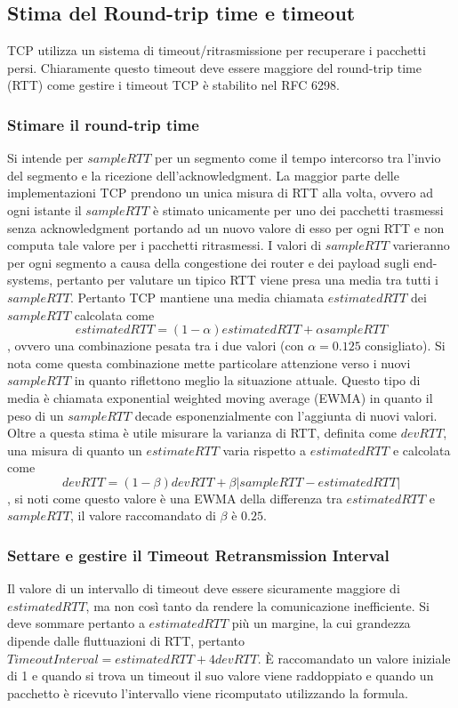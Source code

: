 \subsection{Stima del Round-trip time e timeout}
TCP utilizza un sistema di timeout/ritrasmissione per recuperare i pacchetti persi. Chiaramente questo timeout deve essere maggiore del round-trip time 
(RTT) come gestire i timeout TCP \`e stabilito nel RFC 6298.
\subsubsection{Stimare il round-trip time}
Si intende per $sampleRTT$ per un segmento come il tempo intercorso tra l'invio del segmento e la ricezione dell'acknowledgment. La maggior parte delle 
implementazioni TCP prendono un unica misura di RTT alla volta, ovvero ad ogni istante il $sampleRTT$ \`e stimato unicamente per uno dei pacchetti trasmessi
senza acknowledgment portando ad un nuovo valore di esso per ogni RTT e non computa tale valore per i pacchetti ritrasmessi. I valori di $sampleRTT$ 
varieranno per ogni segmento a causa della congestione dei router e dei payload sugli end-systems, pertanto per valutare un tipico RTT viene presa una media
tra tutti i $sampleRTT$. Pertanto TCP mantiene una media chiamata $estimatedRTT$ dei $sampleRTT$ calcolata come $$estimatedRTT=(1-\alpha)estimatedRTT+\alpha
sampleRTT$$, ovvero una combinazione pesata tra i due valori (con $\alpha=0.125$ consigliato). Si nota come questa combinazione mette particolare attenzione
verso i nuovi $sampleRTT$ in quanto riflettono meglio la situazione attuale. Questo tipo di media \`e chiamata exponential weighted moving average (EWMA) in
quanto il peso di un $sampleRTT$ decade esponenzialmente con l'aggiunta di nuovi valori. Oltre a questa stima \`e utile misurare la varianza di RTT, 
definita come $devRTT$, una misura di quanto un $estimateRTT$ varia rispetto a $estimatedRTT$ e calcolata come $$devRTT=(1-\beta)devRTT+\beta|sampleRTT-
estimatedRTT|$$, si noti come questo valore \`e una EWMA della differenza tra $estimatedRTT$ e $sampleRTT$, il valore raccomandato di $\beta$ \`e $0.25$.
\subsubsection{Settare e gestire il Timeout Retransmission Interval}
Il valore di un intervallo di timeout deve essere sicuramente maggiore di $estimatedRTT$, ma non cos\`i tanto da rendere la comunicazione inefficiente.
Si deve sommare pertanto a $estimatedRTT$ pi\`u un margine, la cui grandezza dipende dalle fluttuazioni di RTT, pertanto $TimeoutInterval=estimatedRTT+
4devRTT$. \`E raccomandato un valore iniziale di 1 e quando si trova un timeout il suo valore viene raddoppiato e quando un pacchetto \`e ricevuto 
l'intervallo viene ricomputato utilizzando la formula.
